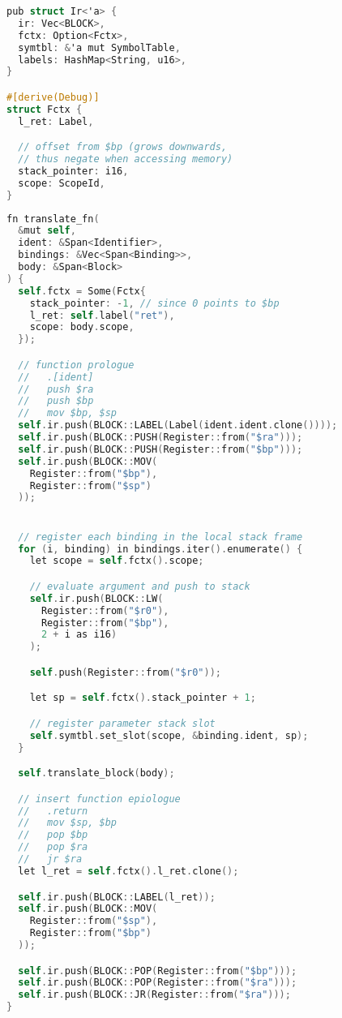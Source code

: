 \begin{lstlisting}[language=C]
pub struct Ir<'a> {
  ir: Vec<BLOCK>,
  fctx: Option<Fctx>,
  symtbl: &'a mut SymbolTable,
  labels: HashMap<String, u16>,
}

#[derive(Debug)]
struct Fctx {
  l_ret: Label,

  // offset from $bp (grows downwards, 
  // thus negate when accessing memory)
  stack_pointer: i16, 
  scope: ScopeId,
}
\end{lstlisting}

\begin{lstlisting}[language=C]
fn translate_fn(
  &mut self, 
  ident: &Span<Identifier>, 
  bindings: &Vec<Span<Binding>>, 
  body: &Span<Block>
) {
  self.fctx = Some(Fctx{
    stack_pointer: -1, // since 0 points to $bp
    l_ret: self.label("ret"),
    scope: body.scope,
  });

  // function prologue
  //   .[ident]
  //   push $ra 
  //   push $bp
  //   mov $bp, $sp
  self.ir.push(BLOCK::LABEL(Label(ident.ident.clone())));
  self.ir.push(BLOCK::PUSH(Register::from("$ra")));
  self.ir.push(BLOCK::PUSH(Register::from("$bp")));
  self.ir.push(BLOCK::MOV(
    Register::from("$bp"), 
    Register::from("$sp")
  ));


  // register each binding in the local stack frame
  for (i, binding) in bindings.iter().enumerate() {
    let scope = self.fctx().scope;

    // evaluate argument and push to stack 
    self.ir.push(BLOCK::LW(
      Register::from("$r0"), 
      Register::from("$bp"), 
      2 + i as i16)
    );

    self.push(Register::from("$r0"));

    let sp = self.fctx().stack_pointer + 1; 

    // register parameter stack slot 
    self.symtbl.set_slot(scope, &binding.ident, sp);
  }

  self.translate_block(body);

  // insert function epiologue
  //   .return
  //   mov $sp, $bp
  //   pop $bp
  //   pop $ra
  //   jr $ra
  let l_ret = self.fctx().l_ret.clone();

  self.ir.push(BLOCK::LABEL(l_ret));
  self.ir.push(BLOCK::MOV(
    Register::from("$sp"), 
    Register::from("$bp")
  ));

  self.ir.push(BLOCK::POP(Register::from("$bp")));
  self.ir.push(BLOCK::POP(Register::from("$ra")));
  self.ir.push(BLOCK::JR(Register::from("$ra")));
}
\end{lstlisting}


